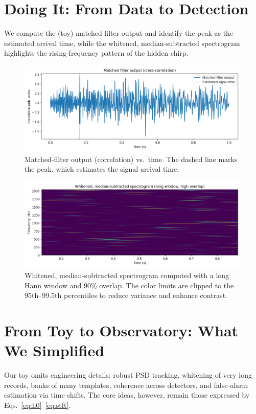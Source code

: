 \documentclass[11pt,a4paper]{article}
\begin{document}
\section{Doing It: From Data to Detection}
We compute the (toy) matched filter output and identify the peak as the estimated arrival time, while the whitened, median-subtracted spectrogram highlights the rising-frequency pattern of the hidden chirp.

\begin{figure}[h!]
\centering
\includegraphics[width=0.95\linewidth]{fig2_correlation.png}
\caption{Matched-filter output (correlation) vs.\ time. The dashed line marks the peak, which estimates the signal arrival time.}
\label{fig:corr}
\end{figure}

\begin{figure}[h!]
\centering
\includegraphics[width=0.95\linewidth]{fig4_spectrogram.png}
\caption{Whitened, median-subtracted spectrogram computed with a long Hann window and 90\% overlap. The color limits are clipped to the 95th--99.5th percentiles to reduce variance and enhance contrast.}
\label{fig:spec}
\end{figure}

\section{From Toy to Observatory: What We Simplified}
Our toy omits engineering details: robust PSD tracking, whitening of very long records, banks of many templates, coherence across detectors, and false-alarm estimation via time shifts. The core ideas, however, remain those expressed by Eqs.~\eqref{eq:h0}--\eqref{eq:stft}.
\end{document}
